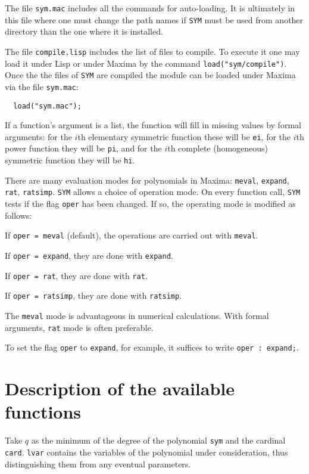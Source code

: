 \documentclass[11pt]{article}
\begin{document}
The file \texttt{sym.mac} includes all the commands for auto-loading.  It is
ultimately in this file where one must change the path names if \texttt{SYM}
must be used from another directory than the one where it is installed.

The file \texttt{compile.lisp} includes the list of files to compile.  To execute
it one may load it under Lisp or under Maxima by the command
\texttt{load("sym/compile")}.  Once the the files of \texttt{SYM} are compiled
the module can be loaded under Maxima via the file \texttt{sym.mac}:
\begin{verbatim}
  load("sym.mac");
\end{verbatim}

If a function's argument is a list, the function will fill in missing values by
formal arguments: for the $i$th elementary symmetric function these will be
\texttt{ei}, for the $i$th power function they will be \texttt{pi}, and for the
$i$th complete (homogeneous) symmetric function they will be \texttt{hi}.

There are many evaluation modes for polynomials in Maxima: \texttt{meval},
\texttt{expand}, \texttt{rat}, \texttt{ratsimp}.  \texttt{SYM} allows a choice
of operation mode.  On every function call, \texttt{SYM} tests if the flag
\texttt{oper} has been changed.  If so, the operating mode is modified as
follows:
\begin{description}
  \item If \texttt{oper = meval} (default), the operations are carried out with
  \texttt{meval}.
  \item If \texttt{oper = expand}, they are done with \texttt{expand}.
  \item If \texttt{oper = rat}, they are done with \texttt{rat}.
  \item If \texttt{oper = ratsimp}, they are done with \texttt{ratsimp}.
\end{description}
The \texttt{meval} mode is advantageous in numerical calculations.  With formal
arguments, \texttt{rat} mode is often preferable.

To set the flag \texttt{oper} to \texttt{expand}, for example, it suffices to
write \texttt{oper\ :\ expand;}.



\section{Description of the available functions}

Take $q$ as the minimum of the degree of the polynomial \texttt{sym} and the
cardinal \texttt{card}.  \texttt{lvar} contains the variables of the polynomial
under consideration, thus distinguishing them from any eventual parameters.
\end{document}
